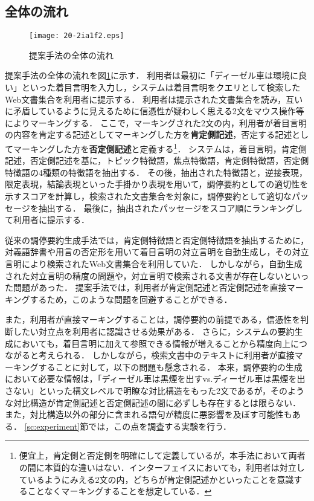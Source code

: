 \documentclass[japanese]{jnlp_1.4}
\begin{document}
\subsection{全体の流れ}
\label{ssc:flowchart}

\begin{figure}[t]
\begin{center}
\texttt{[image: 20-2ia1f2.eps]}
\end{center}
\caption{提案手法の全体の流れ}
\label{fg:outline}
\end{figure}

提案手法の全体の流れを図\ref{fg:outline}に示す．
利用者は最初に「ディーゼル車は環境に良い」といった着目言明を入力し，システムは着目言明をクエリとして検索したWeb文書集合を利用者に提示する．
利用者は提示された文書集合を読み，互いに矛盾しているように見えるために信憑性が疑わしく思える2文をマウス操作等によりマーキングする．
ここで，マーキングされた2文の内，利用者が着目言明の内容を肯定する記述としてマーキングした方を{\bf 肯定側記述}，否定する記述としてマーキングした方を{\bf 否定側記述}と定義する\footnote{便宜上，肯定側と否定側を明確にして定義しているが，本手法において両者の間に本質的な違いはない．インターフェイスにおいても，利用者は対立しているようにみえる2文の内，どちらが肯定側記述かといったことを意識することなくマーキングすることを想定している．}．
システムは，着目言明，肯定側記述，否定側記述を基に，トピック特徴語，焦点特徴語，肯定側特徴語，否定側特徴語の4種類の特徴語を抽出する．
その後，抽出された特徴語と，逆接表現，限定表現，結論表現といった手掛かり表現を用いて，調停要約としての適切性を示すスコアを計算し，検索された文書集合を対象に，調停要約として適切なパッセージを抽出する．
最後に，抽出されたパッセージをスコア順にランキングして利用者に提示する．

従来の調停要約生成手法では，肯定側特徴語と否定側特徴語を抽出するために，対義語辞書や用言の否定形を用いて着目言明の対立言明を自動生成し，その対立言明により検索されたWeb文書集合を利用していた．
しかしながら，自動生成された対立言明の精度の問題や，対立言明で検索される文書が存在しないといった問題があった．
提案手法では，利用者が肯定側記述と否定側記述を直接マーキングするため，このような問題を回避することができる．

また，利用者が直接マーキングすることは，調停要約の前提である，信憑性を判断したい対立点を利用者に認識させる効果がある．
さらに，システムの要約生成においても，着目言明に加えて参照できる情報が増えることから精度向上につながると考えられる．
しかしながら，検索文書中のテキストに利用者が直接マーキングすることに対して，以下の問題も懸念される．
本来，調停要約の生成において必要な情報は，「ディーゼル車は黒煙を出すvs.ディーゼル車は黒煙を出さない」といった構文レベルで明瞭な対比構造をもった2文であるが，そのような対比構造が肯定側記述と否定側記述の間に必ずしも存在するとは限らない．
また，対比構造以外の部分に含まれる語句が精度に悪影響を及ぼす可能性もある．
\ref{sc:experiment}節では，この点を調査する実験を行う．
\end{document}
